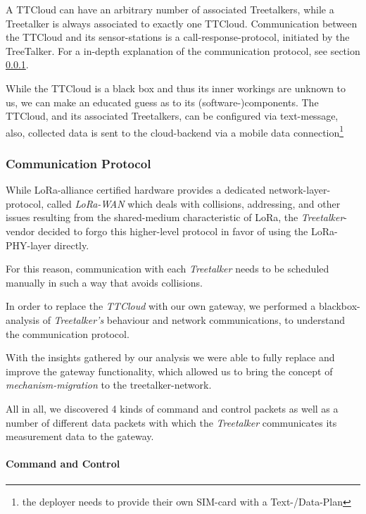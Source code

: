 A TTCloud can have an arbitrary number of associated Treetalkers, while a Treetalker is always associated to exactly one TTCloud.
Communication between the TTCloud and its sensor-stations is a call-response-protocol, initiated by the TreeTalker.
For a in-depth explanation of the communication protocol, see section \ref{sec:implementation:treetalker:protocol}.

While the TTCloud is a black box and thus its inner workings are unknown to us, we can make an educated guess as to its (software-)components.
The TTCloud, and its associated Treetalkers, can be configured via text-message, also, collected data is sent to the cloud-backend via a mobile data connection\footnote{the deployer needs to provide their own SIM-card with a Text-/Data-Plan}

\subsubsection{Communication Protocol}
\label{sec:implementation:treetalker:protocol}

While LoRa-alliance certified hardware provides a dedicated network-layer-protocol, called \textit{LoRa-WAN} which deals with collisions, addressing, and other issues resulting from the shared-medium characteristic of LoRa, the \textit{Treetalker}-vendor decided to forgo this higher-level protocol in favor of using the LoRa-PHY-layer directly.

For this reason, communication with each \textit{Treetalker} needs to be scheduled manually in such a way that avoids collisions.

In order to replace the \textit{TTCloud} with our own gateway, we performed a blackbox-analysis of \textit{Treetalker's} behaviour and network communications, to understand the communication protocol.

With the insights gathered by our analysis we were able to fully replace and improve the gateway functionality, which allowed us to bring the concept of \textit{mechanism-migration} to the treetalker-network.

All in all, we discovered 4 kinds of command and control packets as well as a number of different data packets with which the \textit{Treetalker} communicates its measurement data to the gateway.

\paragraph{Command and Control}

